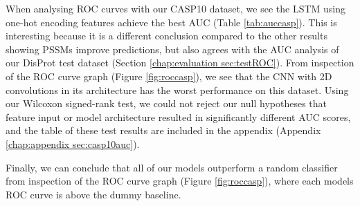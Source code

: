 \documentclass{l4proj}
\begin{document}
When analysing ROC curves with our CASP10 dataset, we see the LSTM using one-hot encoding features achieve the best AUC (Table \ref{tab:auccasp}). This is interesting because it is a different conclusion compared to the other results showing PSSMs improve predictions, but also agrees with the AUC analysis of our DisProt test dataset (Section \ref{chap:evaluation sec:testROC}). From inspection of the ROC curve graph (Figure \ref{fig:roccasp}), we see that the CNN with 2D convolutions in its architecture has the worst performance on this dataset. Using our Wilcoxon signed-rank test, we could not reject our null hypotheses that feature input or model architecture resulted in significantly different AUC scores, and the table of these test results are included in the appendix (Appendix \ref{chap:appendix sec:casp10auc}).

Finally, we can conclude that all of our models outperform a random classifier from inspection of the ROC curve graph (Figure \ref{fig:roccasp}), where each models ROC curve is above the dummy baseline.
\end{document}
